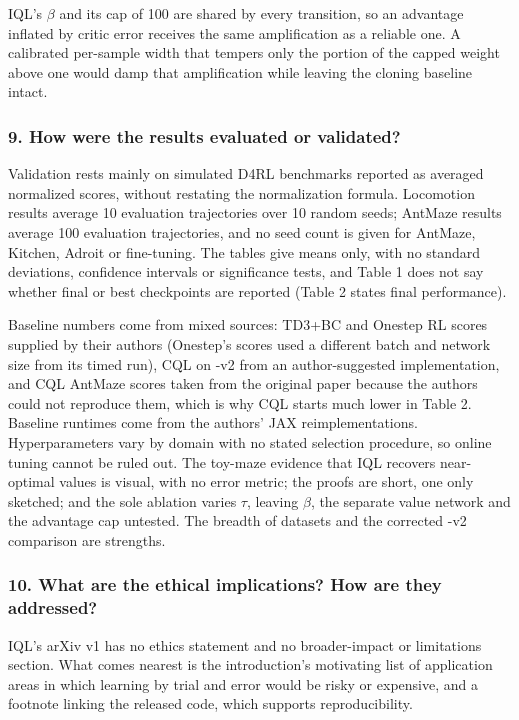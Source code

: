 \documentclass[11pt]{article}
\newcommand{\question}[1]{\subsubsection*{#1}}
\begin{document}
IQL's \ensuremath{\beta} and its cap of 100 are shared by every transition, so an advantage inflated by critic error receives the same amplification as a reliable one. A calibrated per-sample width that tempers only the portion of the capped weight above one would damp that amplification while leaving the cloning baseline intact.

\question{9. How were the results evaluated or validated?}

Validation rests mainly on simulated D4RL benchmarks reported as averaged normalized scores, without restating the normalization formula. Locomotion results average 10 evaluation trajectories over 10 random seeds; AntMaze results average 100 evaluation trajectories, and no seed count is given for AntMaze, Kitchen, Adroit or fine-tuning. The tables give means only, with no standard deviations, confidence intervals or significance tests, and Table 1 does not say whether final or best checkpoints are reported (Table 2 states final performance).

Baseline numbers come from mixed sources: TD3+BC and Onestep RL scores supplied by their authors (Onestep's scores used a different batch and network size from its timed run), CQL on -v2 from an author-suggested implementation, and CQL AntMaze scores taken from the original paper because the authors could not reproduce them, which is why CQL starts much lower in Table 2. Baseline runtimes come from the authors' JAX reimplementations. Hyperparameters vary by domain with no stated selection procedure, so online tuning cannot be ruled out. The toy-maze evidence that IQL recovers near-optimal values is visual, with no error metric; the proofs are short, one only sketched; and the sole ablation varies \ensuremath{\tau}, leaving \ensuremath{\beta}, the separate value network and the advantage cap untested. The breadth of datasets and the corrected -v2 comparison are strengths.

\question{10. What are the ethical implications? How are they addressed?}

IQL's arXiv v1 has no ethics statement and no broader-impact or limitations section. What comes nearest is the introduction's motivating list of application areas in which learning by trial and error would be risky or expensive, and a footnote linking the released code, which supports reproducibility.
\end{document}
